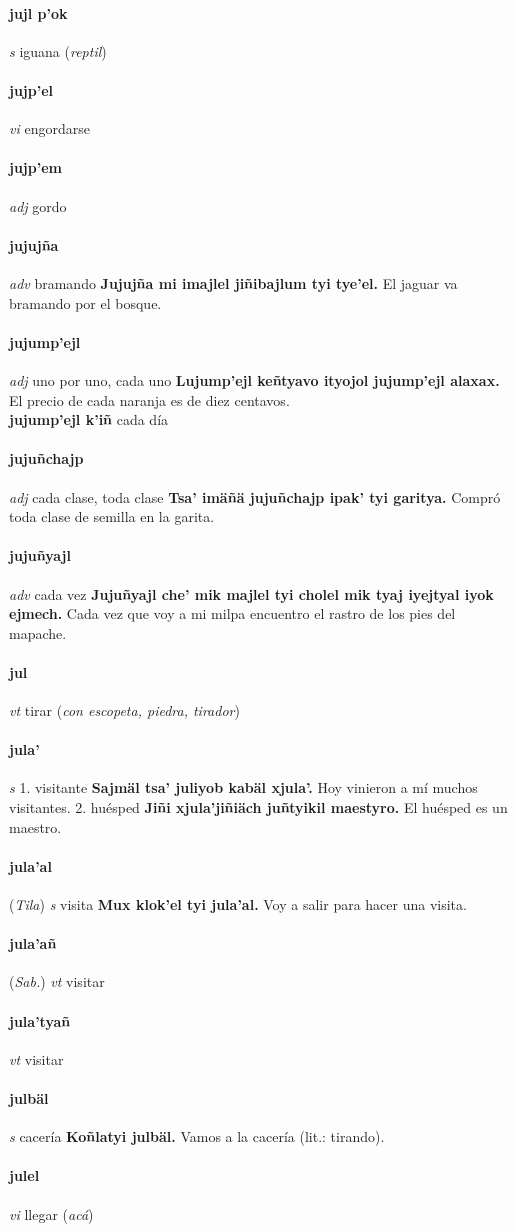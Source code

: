 \documentclass{scrbook}
\newcommand{\entry}[1]{\paragraph{#1}}
\newcommand{\onedefinition}[1]{#1.}
\newcommand{\partofspeech}[1]{\textit{#1}}
\newcommand{\spanishtranslation}[1]{#1}
\newcommand{\clarification}[1]{(\textit{#1})}
\newcommand{\cholexample}[1]{\textbf{#1}}
\newcommand{\exampletranslation}[1]{#1}
\newcommand{\relevantdialect}[1]{(\textit{#1})}
\newcommand{\secondaryentry}[1]{\\\textbf{#1}}
\newcommand{\secondtranslation}[1]{#1}
\begin{document}
\begin{multicols}{2}
\entry{jujl p'ok}
\partofspeech{s}
\spanishtranslation{iguana}
\clarification{reptil}

\entry{jujp'el}
\partofspeech{vi}
\spanishtranslation{engordarse}

\entry{jujp'em}
\partofspeech{adj}
\spanishtranslation{gordo}

\entry{jujujña}
\partofspeech{adv}
\spanishtranslation{bramando}
\cholexample{Jujujña mi imajlel jiñibajlum tyi tye'el.}
\exampletranslation{El jaguar va bramando por el bosque.}

\entry{jujump'ejl}
\partofspeech{adj}
\spanishtranslation{uno por uno, cada uno}
\cholexample{Lujump'ejl keñtyavo ityojol jujump'ejl alaxax.}
\exampletranslation{El precio de cada naranja es de diez centavos.}
\secondaryentry{jujump'ejl k'iñ}
\secondtranslation{cada día}

\entry{jujuñchajp}
\partofspeech{adj}
\spanishtranslation{cada clase, toda clase}
\cholexample{Tsa' imäñä jujuñchajp ipak' tyi garitya.}
\exampletranslation{Compró toda clase de semilla en la garita.}

\entry{jujuñyajl}
\partofspeech{adv}
\spanishtranslation{cada vez}
\cholexample{Jujuñyajl che' mik majlel tyi cholel mik tyaj iyejtyal iyok ejmech.}
\exampletranslation{Cada vez que voy a mi milpa encuentro el rastro de los pies del mapache.}

\entry{jul}
\partofspeech{vt}
\spanishtranslation{tirar}
\clarification{con escopeta, piedra, tirador}

\entry{jula'}
\partofspeech{s}
\onedefinition{1}
\spanishtranslation{visitante}
\cholexample{Sajmäl tsa' juliyob kabäl xjula'.}
\exampletranslation{Hoy vinieron a mí muchos visitantes.}
\onedefinition{2}
\spanishtranslation{huésped}
\cholexample{Jiñi xjula'jiñiäch juñtyikil maestyro.}
\exampletranslation{El huésped es un maestro.}

\entry{jula'al}
\relevantdialect{Tila}
\partofspeech{s}
\spanishtranslation{visita}
\cholexample{Mux klok'el tyi jula'al.}
\exampletranslation{Voy a salir para hacer una visita.}

\entry{jula'añ}
\relevantdialect{Sab.}
\partofspeech{vt}
\spanishtranslation{visitar}

\entry{jula'tyañ}
\partofspeech{vt}
\spanishtranslation{visitar}

\entry{julbäl}
\partofspeech{s}
\spanishtranslation{cacería}
\cholexample{Koñlatyi julbäl.}
\exampletranslation{Vamos a la cacería (lit.: tirando).}

\entry{julel}
\partofspeech{vi}
\spanishtranslation{llegar}
\clarification{acá}


\end{multicols}
\end{document}
